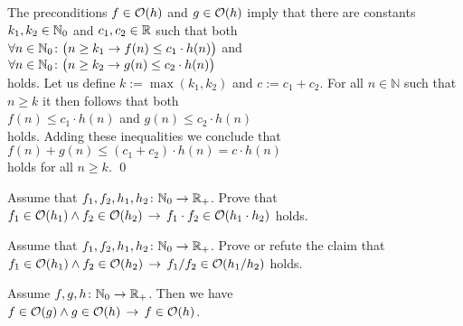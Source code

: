 \proof
The preconditions $f \in \mathcal{O}(h)$ and $g \in \mathcal{O}(h)$ imply that there are constants $k_1,k_2\in {\mathbb N}_0$
and $c_1,c_2\in {\mathbb R}$ such that both \\[0.2cm]
\hspace*{1.3cm} 
$\forall n \in {\mathbb N}_0 \colon \bigl( n \geq k_1 \rightarrow f(n) \leq c_1 \cdot h(n)\bigr)$ 
\quad and
\\[0.2cm]
\hspace*{1.3cm} 
$\forall n \in {\mathbb N}_0 \colon\bigl( n \geq k_2 \rightarrow g(n) \leq c_2 \cdot h(n)\bigr)$
\\[0.2cm]
holds.  Let us define $k := \max(k_1,k_2)$ and $c:= c_1 + c_2$.  For all $n \in \mathbb{N}$ such
that $n \geq k$ it then follows that both
\\[0.2cm]
\hspace*{1.3cm}
 $f(n) \leq c_1 \cdot h(n)$ \quad and \quad  $g(n) \leq c_2 \cdot h(n)$
\\[0.2cm]
holds.  Adding these inequalities we conclude that 
\\[0.2cm]
\hspace*{1.3cm} $f(n) + g(n) \leq (c_1 + c_2) \cdot h(n) = c \cdot h(n)$
\\[0.2cm]
holds for all $n \geq k$.
\qed

\exercise
Assume that $f_1,f_2,h_1,h_2 \colon {\mathbb N}_0 \rightarrow {{\mathbb R}_+}$.  Prove that 
\\[0.2cm]
\hspace*{1.3cm}
$f_1 \in \mathcal{O}(h_1) \wedge f_2 \in \mathcal{O}(h_2) \,\rightarrow\, f_1 \cdot f_2 \in \mathcal{O}(h_1 \cdot h_2)$
\quad holds.  \eox


\exercise
Assume that $f_1,f_2,h_1,h_2 \colon {\mathbb N}_0 \rightarrow {{\mathbb R}_+}$.  Prove or refute the claim that 
\\[0.2cm]
\hspace*{1.3cm}
$f_1 \in \mathcal{O}(h_1) \wedge f_2 \in \mathcal{O}(h_2) \,\rightarrow\, f_1 / f_2 \in \mathcal{O}(h_1 / h_2)$
\quad holds.  \eox

\begin{Proposition}[Transitivity]
Assume $f,g,h \colon {\mathbb N}_0 \rightarrow {{\mathbb R}_+}$. Then we have \\[0.2cm]
\hspace*{1.3cm}
 $f \in \mathcal{O}(g) \wedge g \in \mathcal{O}(h) \,\rightarrow\, f \in \mathcal{O}(h)$.

\end{Proposition}

